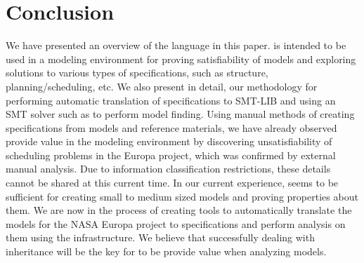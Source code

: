 
\section{Conclusion}
\label{sec:conclusion}

We have presented an overview of the \Klang{} language in this
paper. \Klang{} is intended to be used in a modeling environment for
proving satisfiability of \sysml{} models and exploring solutions to
various types of specifications, such as structure,
planning/scheduling, etc. We also present in detail, our methodology
for performing automatic translation of \Klang{} specifications to
SMT-LIB and using an SMT solver such as \zthree{} to perform model
finding. Using manual methods of creating \Klang{} specifications from
\sysml{} models and reference materials, we have already observed
\Klang{} provide value in the modeling environment by discovering
unsatisfiability of scheduling problems in the Europa project, which
was confirmed by external manual analysis. Due to information
classification restrictions, these details cannot be shared at this
current time. In our current experience, \Klang{} seems to be
sufficient for creating small to medium sized \sysml{} models and
proving properties about them. We are now in the process of creating
tools to automatically translate the \sysml{} models for the NASA
Europa project to \Klang{} specifications and perform analysis on them
using the \Klang{} infrastructure. We believe that successfully
dealing with inheritance will be the key for \Klang{} to be provide
value when analyzing \sysml{} models.

